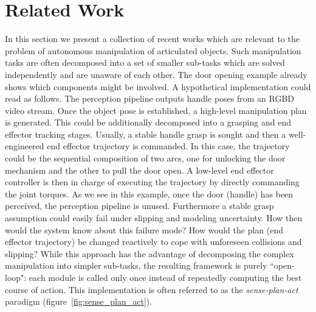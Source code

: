 \section{Related Work}
\label{sec:Related Work}

In this section we present a collection of recent works which are relevant to the problem of autonomous manipulation of articulated objects. Such manipulation tasks are often decomposed into a set of smaller sub-tasks which are solved independently and are unaware of each other. The door opening example already shows which components might be involved. A hypothetical implementation could read as follows. The perception pipeline outputs handle poses from an RGBD video stream. Once the object pose is established, a high-level manipulation plan is generated. This could be additionally decomposed into a grasping and end effector tracking stages. Usually, a stable handle grasp is sought and then a well-engineered end effector trajectory is commanded. In this case, the trajectory could be the sequential composition of two arcs, one for unlocking the door mechanism and the other to pull the door open. A low-level end effector controller is then in charge of executing the trajectory by directly commanding the joint torques. As we see in this example, once the door (handle) has been perceived, the perception pipeline is unused. Furthermore a stable grasp assumption could easily fail under slipping and modeling uncertainty. How then would the system know about this failure mode? How would the plan (end effector trajectory) be changed reactively to cope with unforeseen collisions and slipping? While this approach has the advantage of decomposing the complex manipulation into simpler sub-tasks, the resulting framework is purely ``open-loop": each module is called only once instead of repeatedly computing the best course of action. This implementation is often referred to as the \emph{sense-plan-act} paradigm (figure~\ref{fig:sense_plan_act}).     


